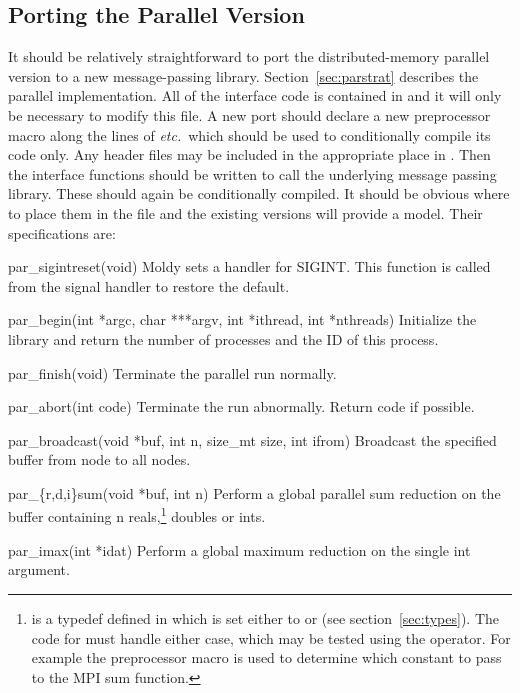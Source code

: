 \documentclass[a4paper,twoside]{report}
\newcommand{\etc}{\emph{etc.}}
\begin{document}
\subsection{Porting the Parallel Version}
\label{sec:parport}
It should be relatively straightforward to port the distributed-memory
parallel version to a new message-passing library.
Section~\ref{sec:parstrat} describes the parallel implementation. All
of the interface code is contained in  and it will
only be necessary to modify this file.  A new port should declare a
new preprocessor macro along the lines of  \etc\ which
should be used to conditionally compile its code only.  Any header
files may be included in the appropriate place in .
Then the interface functions should be written to call the underlying
message passing library. These should again be conditionally compiled.
It should be obvious where to place them in the file and the existing
versions will provide a model.  Their specifications are:

\begin{Litdescription}
\sloppy
\item[par\_sigintreset(void)] Moldy sets a handler for SIGINT\@.  This
  function is called from the signal handler to restore the default.
\item[par\_begin(int *argc, char ***argv, int *ithread, int
  *nthreads)] Initialize the library and return the number of
  processes and the ID of this process.
\item[par\_finish(void)] Terminate the parallel run normally.
\item[par\_abort(int code)] Terminate the run abnormally.  Return code
  if possible.
\item[par\_broadcast(void *buf, int n, size\_mt size, int ifrom)]
  Broadcast the specified buffer from node  to all nodes.
\item[par\_\{r,d,i\}sum(void *buf, int n)] Perform a global parallel
  sum reduction on the buffer containing n reals,\footnote{
    is a typedef defined in  which is set either to
     or  (see section~\ref{sec:types}).  The
    code for  must handle either case, which may be
    tested using the  operator. For example the
    preprocessor macro  is used
    to determine which constant to pass to the MPI sum function.}
  doubles or ints. 
\item[par\_imax(int *idat)] Perform a global maximum reduction on
  the single int argument.
\fussy
\end{Litdescription}
\end{document}
